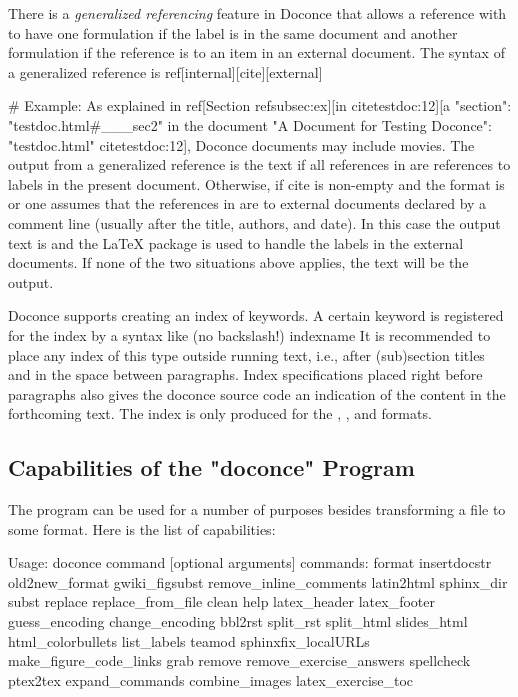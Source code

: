 \documentclass[%
oneside,                 %
final,                   %
chapterprefix=true,      %
open=right               %
10pt]{book}
\begin{document}
{There is a \emph{generalized referencing} feature in Doconce that allows
a reference with  to have one formulation if the label is
in the same document and another formulation if the reference is
to an item in an external document. The syntax of a generalized
reference is
\bccq
ref[internal][cite][external]

# Example:
As explained in
ref[Section ref{subsec:ex}][in cite{testdoc:12}][a "section":
"testdoc.html#___sec2" in the document
"A Document for Testing Doconce": "testdoc.html" cite{testdoc:12}],
Doconce documents may include movies.
\eccq
The output from a generalized reference is the text  if all
 references in  are references to labels in the
present document. Otherwise, if cite is non-empty and the format is
 or  one assumes that the references in 
are to external documents declared by a comment line  (usually after the title, authors,
and date). In this case the output text is  and the
{\LaTeX} package  is used to handle the labels in the external
documents.  If none of the two situations above applies, the
 text will be the output.

Doconce supports creating an index of keywords. A certain keyword
is registered for the index by a syntax like (no
backslash!)
\bccq
index{name}
\eccq
It is recommended to place any index of this type outside
running text, i.e., after (sub)section titles and in the space between
paragraphs. Index specifications placed right before paragraphs also
gives the doconce source code an indication of the content in the
forthcoming text. The index is only produced for the , , and
 formats.

\subsection{Capabilities of the "doconce" Program}

The  program can be used for a number of purposes besides
transforming a  file to some format. Here is the
list of capabilities:

\bshpro
Usage: doconce command [optional arguments]
commands: format insertdocstr old2new_format gwiki_figsubst remove_inline_comments latin2html sphinx_dir subst replace replace_from_file clean help latex_header latex_footer guess_encoding change_encoding bbl2rst split_rst split_html slides_html html_colorbullets list_labels teamod sphinxfix_localURLs make_figure_code_links grab remove remove_exercise_answers spellcheck ptex2tex expand_commands combine_images latex_exercise_toc


}
\end{document}
